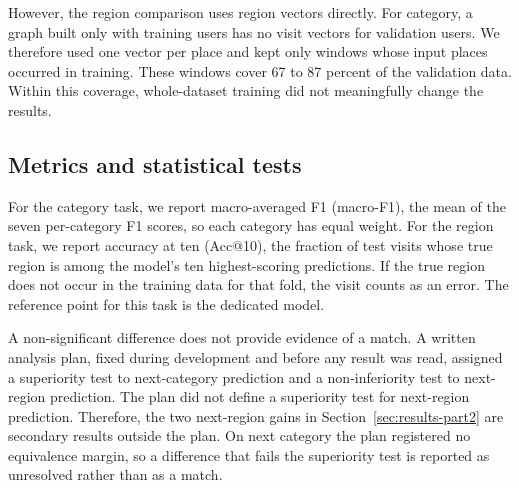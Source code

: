 However, the region comparison uses region vectors directly. For category, a graph built only
with training users has no visit vectors for validation users. We therefore used one
vector per place and kept only windows whose input places occurred in training. These
windows cover 67 to 87 percent of the validation data. Within this
coverage, whole-dataset training did not meaningfully change the results.


\subsection{Metrics and statistical tests}
\label{sec:setup-metrics}
For the category task, we report macro-averaged F1 (macro-F1), the mean of the seven per-category F1 scores, so each category has equal weight. For the region task, we report accuracy at ten (Acc@10), the fraction of test visits whose true region is among the model's ten highest-scoring predictions. If the true region does not occur in the training data for that fold, the visit counts as an error. The reference point for this task is the dedicated model.

A non-significant difference does not provide evidence of a match. A written analysis plan, fixed during development and before any result was read, assigned a superiority test to next-category prediction and a non-inferiority test to next-region prediction. The plan did not define a superiority test for next-region prediction. Therefore, the two next-region gains in Section~\ref{sec:results-part2} are secondary results outside the plan. On next category the plan registered no equivalence margin, so a difference that fails the superiority test is reported as unresolved rather than as a match.

